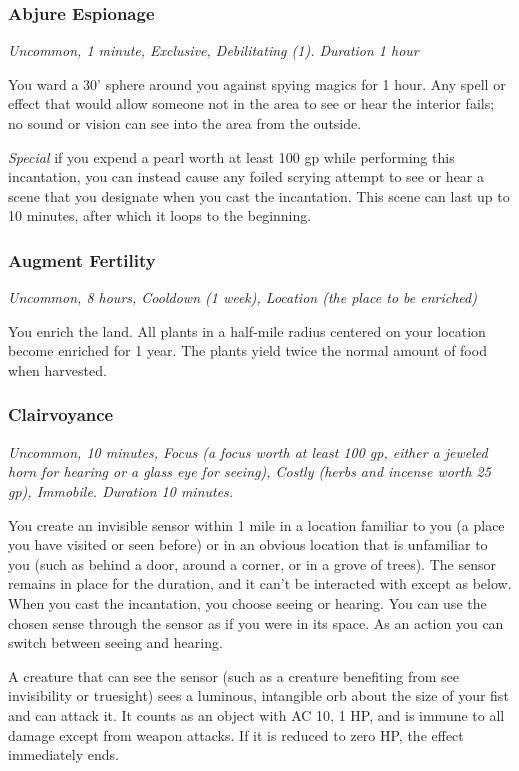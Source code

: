 \subsubsection{Abjure Espionage}
\textit{Uncommon, 1 minute, Exclusive, Debilitating (1). Duration 1 hour}

You ward a 30' sphere around you against spying magics for 1 hour. Any spell or effect that would allow someone not in the area to see or hear the interior fails; no sound or vision can see into the area from the outside.

\textit{Special} if you expend a pearl worth at least 100 gp while performing this incantation, you can instead cause any foiled scrying attempt to see or hear a scene that you designate when you cast the incantation. This scene can last up to 10 minutes, after which it loops to the beginning.

\subsubsection{Augment Fertility}
\textit{Uncommon, 8 hours, Cooldown (1 week), Location (the place to be enriched)}

You enrich the land. All plants in a half-mile radius centered on your location become enriched for 1 year. The plants yield twice the normal amount of food when harvested.

\subsubsection{Clairvoyance}
\textit{Uncommon, 10 minutes, Focus (a focus worth at least 100 gp, either a jeweled horn for hearing or a glass eye for seeing), Costly (herbs and incense worth 25 gp), Immobile. Duration 10 minutes.}

You create an invisible sensor within 1 mile in a location familiar to you (a place you have visited or seen before) or in an obvious location that is unfamiliar to you (such as behind a door, around a corner, or in a grove of trees). The sensor remains in place for the duration, and it can't be interacted with except as below.
When you cast the incantation, you choose seeing or hearing. You can use the chosen sense through the sensor as if you were in its space. As an action you can switch between seeing and hearing.

A creature that can see the sensor (such as a creature benefiting from see invisibility or truesight) sees a luminous, intangible orb about the size of your fist and can attack it. It counts as an object with AC 10, 1 HP, and is immune to all damage except from weapon attacks. If it is reduced to zero HP, the effect immediately ends.

